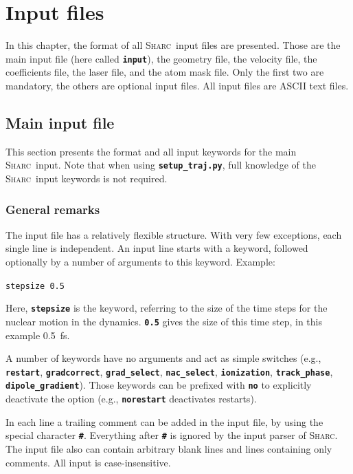\documentclass[a4paper,10pt,DIV=15,openany]{scrbook}
\newcommand{\sharc}{\textsc{Sharc}}
\newcommand{\ttt}[1]{\textbf{\texttt{#1}}}
\newenvironment{example}{
  \setlength{\OuterFrameSep}{3pt}
  \vspace{0mm}
  \definecolor{shadecolor}{HTML}{E4F4FF}
  \begin{shaded}
}{
  \end{shaded}
}
\begin{document}
\chapter{Input files}\label{chap:input}

In this chapter, the format of all \sharc\ input files are presented. Those are the main input file (here called \ttt{input}), the geometry file, the velocity file, the coefficients file, the laser file, and the atom mask file. Only the first two are mandatory, the others are optional input files. All input files are ASCII text files.


\section{Main input file}\label{sec:inputfile}

This section presents the format and all input keywords for the main \sharc\ input. Note that when using \ttt{setup\_traj.py}, full knowledge of the \sharc\ input keywords is not required.

\subsection{General remarks}

The input file has a relatively flexible structure. With very few exceptions, each single line is independent. An input line starts with a keyword, followed optionally by a number of arguments to this keyword. Example:

\begin{example}
  \verb|stepsize 0.5|
\end{example}

Here, \ttt{stepsize} is the keyword, referring to the size of the time steps for the nuclear motion in the dynamics. \ttt{0.5} gives the size of this time step, in this example 0.5~fs.

A number of keywords have no arguments and act as simple switches (e.g., \ttt{restart}, \ttt{gradcorrect}, \ttt{grad\_select}, \ttt{nac\_select}, \ttt{ionization}, \ttt{track\_phase}, \ttt{dipole\_gradient}). Those keywords can be prefixed with \ttt{no} to explicitly deactivate the option (e.g., \ttt{norestart} deactivates restarts).

In each line a trailing comment can be added in the input file, by using the special character \ttt{\#}. Everything after \ttt{\#} is ignored by the input parser of \sharc. The input file also can contain arbitrary blank lines and lines containing only comments. All input is case-insensitive.
\end{document}
